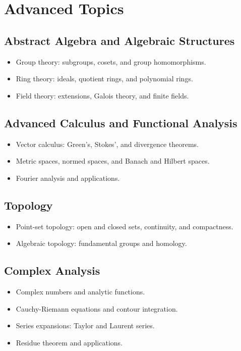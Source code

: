 \documentclass[12pt]{article}
\begin{document}
\section{Advanced Topics}

\subsection{Abstract Algebra and Algebraic Structures}
\begin{itemize}
    \item Group theory: subgroups, cosets, and group homomorphisms.
    \item Ring theory: ideals, quotient rings, and polynomial rings.
    \item Field theory: extensions, Galois theory, and finite fields.
\end{itemize}

\subsection{Advanced Calculus and Functional Analysis}
\begin{itemize}
    \item Vector calculus: Green's, Stokes', and divergence theorems.
    \item Metric spaces, normed spaces, and Banach and Hilbert spaces.
    \item Fourier analysis and applications.
\end{itemize}

\subsection{Topology}
\begin{itemize}
    \item Point-set topology: open and closed sets, continuity, and compactness.
    \item Algebraic topology: fundamental groups and homology.
\end{itemize}

\subsection{Complex Analysis}
\begin{itemize}
    \item Complex numbers and analytic functions.
    \item Cauchy-Riemann equations and contour integration.
    \item Series expansions: Taylor and Laurent series.
    \item Residue theorem and applications.
\end{itemize}
\end{document}
